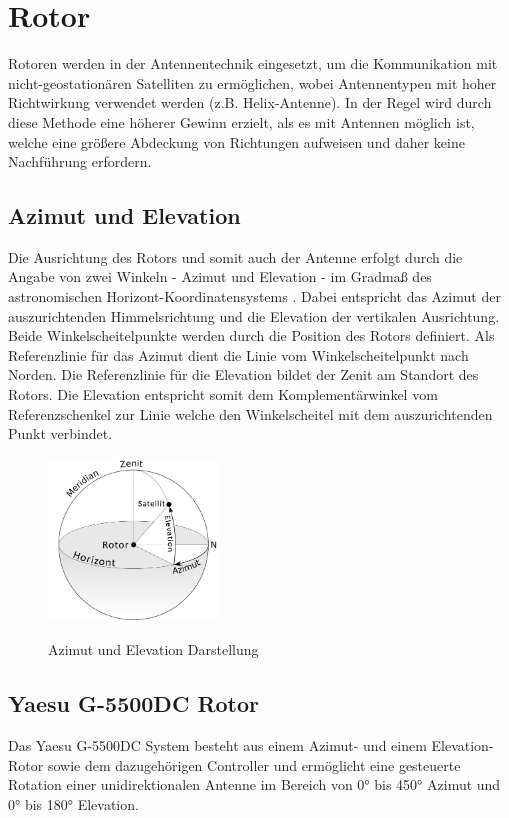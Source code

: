 \chapter{Rotor}
Rotoren werden in der Antennentechnik eingesetzt, um die Kommunikation mit nicht-geostationären Satelliten zu ermöglichen, wobei Antennentypen mit hoher Richtwirkung verwendet werden (z.B. Helix-Antenne). In der Regel wird durch diese Methode eine höherer Gewinn erzielt, als es mit Antennen möglich ist, welche eine größere Abdeckung von Richtungen aufweisen und daher keine Nachführung erfordern. 
\section{Azimut und Elevation}
Die Ausrichtung des Rotors und somit auch der Antenne erfolgt durch die Angabe von zwei Winkeln - Azimut und Elevation - im Gradmaß des astronomischen Horizont-Koordinatensystems \cite{noauthor_astronomische_nodate}. Dabei entspricht das Azimut der auszurichtenden Himmelsrichtung und die Elevation der vertikalen Ausrichtung. Beide Winkelscheitelpunkte werden durch die Position des Rotors definiert. Als Referenzlinie für das Azimut dient die Linie vom Winkelscheitelpunkt nach Norden. Die Referenzlinie für die Elevation bildet der Zenit am Standort des Rotors. Die Elevation entspricht somit dem Komplementärwinkel vom Referenzschenkel zur Linie welche den Winkelscheitel mit dem auszurichtenden Punkt verbindet.

\begin{figure}[H]
	\cite{twcarlson_azimuth_2020}
	\centering
	\includegraphics[width=4.5cm]{../ref/Azimuth-Altitude_schematic_satellit.png}
	\label{fig:Azimut_Elevation_Schematic}
	\caption{Azimut und Elevation Darstellung}
\end{figure}

\section{Yaesu G-5500DC Rotor}
Das Yaesu G-5500DC System \cite{noauthor_yaesu_nodate} besteht aus einem Azimut- und einem Elevation-Rotor sowie dem dazugehörigen Controller und ermöglicht eine gesteuerte Rotation einer unidirektionalen Antenne im Bereich von 0° bis 450° Azimut und 0° bis 180° Elevation.

